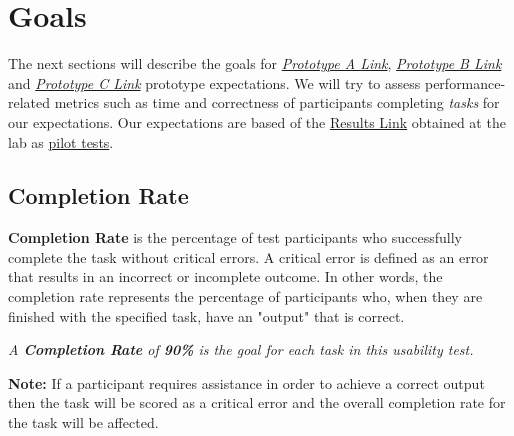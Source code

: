 
\section{Goals}
\label{sec:sec009}

The next sections will describe the goals for {\it \hyperlink{}{Prototype A Link}}, {\it \hyperlink{}{Prototype B Link}} and {\it \hyperlink{}{Prototype C Link}} prototype expectations. We will try to assess performance-related metrics such as time and correctness of participants completing \textit{tasks} for our expectations. Our expectations are based of the \hyperlink{}{Results Link} obtained at the lab as \hyperlink{https://www.nngroup.com/articles/pilot-testing/}{pilot tests}.


\subsection{Completion Rate}

\textbf{Completion Rate} is the percentage of test participants who successfully complete the task without critical errors. A critical error is defined as an error that results in an incorrect or incomplete outcome. In other words, the completion rate represents the percentage of participants who, when they are finished with the specified task, have an "output" that is correct.


\hfill

\textit{A \textbf{Completion Rate} of \textbf{90\%} is the goal for each task in this usability test.}

\hfill



\hfill

\textbf{Note:} If a participant requires assistance in order to achieve a correct output then the task will be scored as a critical error and the overall completion rate for the task will be affected.

